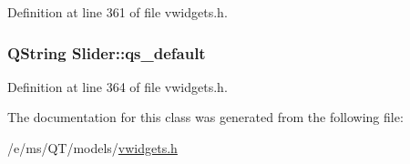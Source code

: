 Definition at line 361 of file vwidgets.h.

\hypertarget{classSlider_ab29b1fabdaa288fa1060bf1f0aa11d5a}{
\subsubsection[{qs\_\-default}]{\setlength{\rightskip}{0pt plus 5cm}QString {\bf Slider::qs\_\-default}}}
\label{classSlider_ab29b1fabdaa288fa1060bf1f0aa11d5a}


Definition at line 364 of file vwidgets.h.



The documentation for this class was generated from the following file:\begin{DoxyCompactItemize}
\item 
/e/ms/QT/models/\hyperlink{vwidgets_8h}{vwidgets.h}\end{DoxyCompactItemize}
